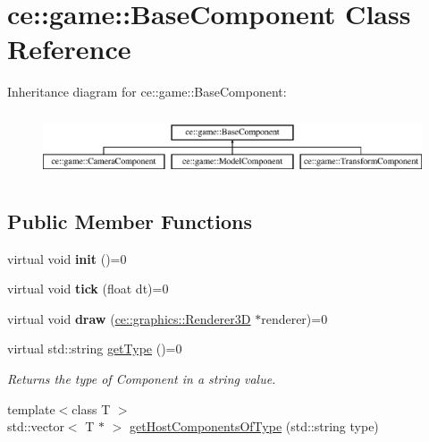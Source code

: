 \hypertarget{classce_1_1game_1_1_base_component}{}\section{ce\+:\+:game\+:\+:Base\+Component Class Reference}
\label{classce_1_1game_1_1_base_component}
Inheritance diagram for ce\+:\+:game\+:\+:Base\+Component\+:\begin{figure}[H]
\begin{center}
\leavevmode
\includegraphics[height=1.904762cm]{classce_1_1game_1_1_base_component}
\end{center}
\end{figure}
\subsection*{Public Member Functions}
\begin{DoxyCompactItemize}
\item 
\mbox{\label{classce_1_1game_1_1_base_component_a0b5c620c6b665489b5665621aba17935}} 
virtual void {\bfseries init} ()=0
\item 
\mbox{\label{classce_1_1game_1_1_base_component_a0a1cda211f84337d2a33937f89aebd6b}} 
virtual void {\bfseries tick} (float dt)=0
\item 
\mbox{\label{classce_1_1game_1_1_base_component_a98da3e6c0af1e20f050ff06749c1299b}} 
virtual void {\bfseries draw} (\hyperlink{classce_1_1graphics_1_1_renderer3_d}{ce\+::graphics\+::\+Renderer3D} $\ast$renderer)=0
\item 
virtual std\+::string \hyperlink{classce_1_1game_1_1_base_component_a1022b55c1926a019a2b3a71fb6b9150e}{get\+Type} ()=0
\begin{DoxyCompactList}\small\item\em Returns the type of Component in a string value. \end{DoxyCompactList}\item 
{\footnotesize template$<$class T $>$ }\\std\+::vector$<$ T $\ast$ $>$ \hyperlink{classce_1_1game_1_1_base_component_af359b12ae4a497e9b36f08286a3849dc}{get\+Host\+Components\+Of\+Type} (std\+::string type)
\end{DoxyCompactItemize}

